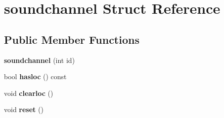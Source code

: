 \hypertarget{structsoundchannel}{}\section{soundchannel Struct Reference}
\label{structsoundchannel}
\subsection*{Public Member Functions}
\begin{DoxyCompactItemize}
\item 
\mbox{\label{structsoundchannel_ac8c0b31803242eab41c8de4bf513525e}} 
{\bfseries soundchannel} (int id)
\item 
\mbox{\label{structsoundchannel_a0ce9f8b61052a667fce6a4526edb9f19}} 
bool {\bfseries hasloc} () const
\item 
\mbox{\label{structsoundchannel_afaf0df194035eb7f3248542a82eb05e9}} 
void {\bfseries clearloc} ()
\item 
\mbox{\label{structsoundchannel_aee2c0312d2726cc5603d8ad0f662d392}} 
void {\bfseries reset} ()
\end{DoxyCompactItemize}
